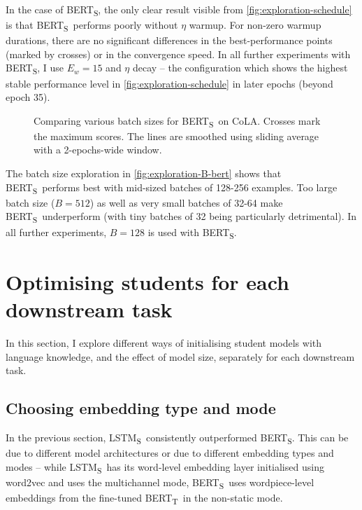 \documentclass[bsc,frontabs,twoside,singlespacing,parskip,deptreport]{infthesis}
\def\BERTT{BERT\textsubscript{T}}
\def\BERTS{BERT\textsubscript{S}}
\def\LSTMS{LSTM\textsubscript{S}}
\def\sliding{The lines are smoothed using sliding average with a 2-epochs-wide window.}
\begin{document}
{{{      In the case of \BERTS, the only clear result visible from \autoref{fig:exploration-schedule} is that \BERTS~performs poorly without $\eta$ warmup. For non-zero warmup durations, there are no significant differences in the best-performance points (marked by crosses) or in the convergence speed. In all further experiments with \BERTS, I use $E_w=15$ and $\eta$ decay -- the configuration which shows the highest stable performance level in \autoref{fig:exploration-schedule} in later epochs (beyond epoch 35).

      \begin{figure}[h!t]
        \centering
        \caption{Comparing various batch sizes for \BERTS~on CoLA. Crosses mark the maximum scores. \sliding}
        \label{fig:exploration-B-bert}
      \end{figure}

      The batch size exploration in \autoref{fig:exploration-B-bert} shows that \BERTS~performs best with mid-sized batches of 128-256 examples. Too large batch size ($B=512$) as well as very small batches of 32-64 make \BERTS~underperform (with tiny batches of 32 being particularly detrimental).
      In all further experiments, $B=128$ is used with \BERTS.
    }

    \section{Optimising students for each downstream task}{
      In this section, I explore different ways of initialising student models with language knowledge, and the effect of model size, separately for each downstream task.

      \subsection{Choosing embedding type and mode}{
        In the previous section, \LSTMS~consistently outperformed \BERTS. This can be due to different model architectures or due to different embedding types and modes -- while \LSTMS~has its word-level embedding layer initialised using word2vec and uses the multichannel mode, \BERTS~uses wordpiece-level embeddings from the fine-tuned \BERTT~in the non-static mode.

}}}}
\end{document}
